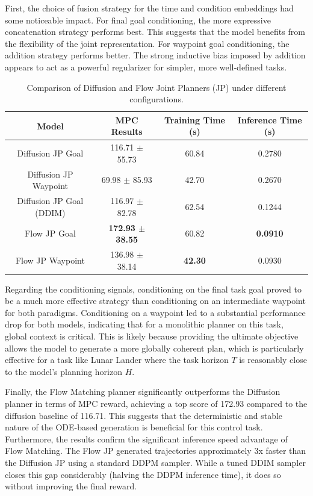 First, the choice of fusion strategy for the time and condition embeddings had some noticeable impact. For final goal conditioning, the more expressive concatenation strategy performs best. This suggests that the model benefits from the flexibility of the joint representation. For waypoint goal conditioning, the addition strategy performs better. The strong inductive bias imposed by addition appears to act as a powerful regularizer for simpler, more well-defined tasks.

\begin{table}[H]
\centering
\caption{Comparison of Diffusion and Flow Joint Planners (JP) under different configurations.}
\label{tab:jp_diffusion_flow}
\begin{tabular}{|c|c|c|c|}
\hline
\textbf{Model} & \textbf{MPC Results} & \textbf{Training Time (s)} & \textbf{Inference Time (s)} \\
\hline
Diffusion JP Goal & 116.71 $\pm$ 55.73 & 60.84 & 0.2780 \\
\hline
Diffusion JP Waypoint & 69.98 $\pm$ 85.93 & 42.70 & 0.2670 \\
\hline
Diffusion JP Goal (DDIM) & 116.97 $\pm$ 82.78 & 62.54 & 0.1244 \\
\hline
Flow JP Goal & \textbf{172.93 $\pm$ 38.55} & 60.82 & \textbf{0.0910} \\
\hline
Flow JP Waypoint & 136.98 $\pm$ 38.14 & \textbf{42.30} & 0.0930 \\
\hline
\end{tabular}
\end{table}

Regarding the conditioning signals, conditioning on the final task goal proved to be a much more effective strategy than conditioning on an intermediate waypoint for both paradigms. Conditioning on a waypoint led to a substantial performance drop for both models, indicating that for a monolithic planner on this task, global context is critical. This is likely because providing the ultimate objective allows the model to generate a more globally coherent plan, which is particularly effective for a task like Lunar Lander where the task horizon $T$ is reasonably close to the model's planning horizon $H$.

Finally, the Flow Matching planner significantly outperforms the Diffusion planner in terms of MPC reward, achieving a top score of 172.93 compared to the diffusion baseline of 116.71. This suggests that the deterministic and stable nature of the ODE-based generation is beneficial for this control task. Furthermore, the results confirm the significant inference speed advantage of Flow Matching. The Flow JP generated trajectories approximately 3x faster than the Diffusion JP using a standard DDPM sampler. While a tuned DDIM sampler closes this gap considerably (halving the DDPM inference time), it does so without improving the final reward.


